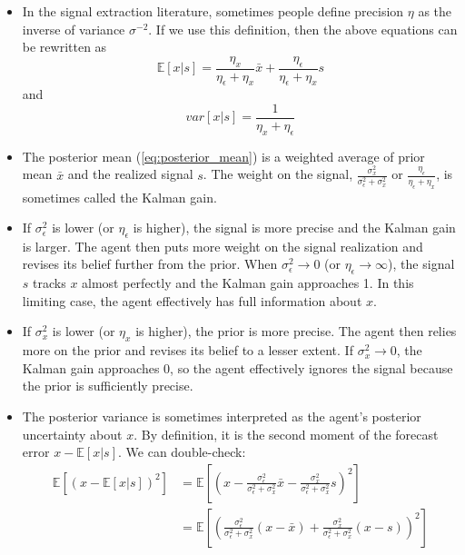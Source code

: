 \documentclass[12pt]{article}
\begin{document}
\begin{itemize}
	\item In the signal extraction literature, sometimes people define precision $\eta$ as the inverse of variance $\sigma^{-2}$. If we use this definition, then the above equations can be rewritten as 
	\begin{equation} \label{eq:precision_mean}
		\mathbb{E}[x|s] = \frac{\eta_{x}}{\eta_\epsilon + \eta_x} \bar{x} + \frac{\eta_\epsilon}{\eta_\epsilon + \eta_x} s
	\end{equation} 
and
\begin{equation} \label{eq:precision_var}
	var[x|s] = \frac{1}{\eta_x + \eta_\epsilon}
\end{equation}
	\item The posterior mean (\ref{eq:posterior_mean}) is a weighted average of prior mean $\bar{x}$ and the realized signal $s$. The weight on the signal, $\frac{\sigma^2_x}{\sigma^2_\epsilon + \sigma^2_x}$ or $\frac{\eta_\epsilon}{\eta_\epsilon + \eta_x}$, is sometimes called the Kalman gain.
	\item If $\sigma^2_{\epsilon}$ is lower (or $\eta_\epsilon$ is higher), the signal is more precise and the Kalman gain is larger. The agent then puts more weight on the signal realization and revises its belief further from the prior. When $\sigma^2_\epsilon \to 0$ (or $\eta_\epsilon \to \infty$), the signal $s$ tracks $x$ almost perfectly and the Kalman gain approaches 1. In this limiting case, the agent effectively has full information about $x$. 
	\item If $\sigma^2_x$ is lower (or $\eta_x$ is higher), the prior is more precise. The agent then relies more on the prior and revises its belief to a lesser extent. If $\sigma^2_x \to 0$, the Kalman gain approaches 0, so the agent effectively ignores the signal because the prior is sufficiently precise.
	\item The posterior variance is sometimes interpreted as the agent's posterior uncertainty about $x$. By definition, it is the second moment of the forecast error $x-\mathbb{E}[x|s]$. We can double-check:
	\begin{align}
		\mathbb{E}\left[(x-\mathbb{E}[x|s])^2\right] & = \mathbb{E}\left[\left(x -\frac{\sigma_\epsilon^2}{\sigma^2_\epsilon + \sigma^2_x} \bar{x} - \frac{\sigma_x^2}{\sigma^2_\epsilon + \sigma^2_x} s \right)^2\right] \nonumber \\
		& = \mathbb{E}\left[\left(\frac{\sigma_\epsilon^2}{\sigma^2_\epsilon + \sigma^2_x} (x-\bar{x}) + \frac{\sigma_x^2}{\sigma^2_\epsilon + \sigma^2_x} (x-s) \right)^2\right] \nonumber \\

\end{align}
\end{itemize}
\end{document}

